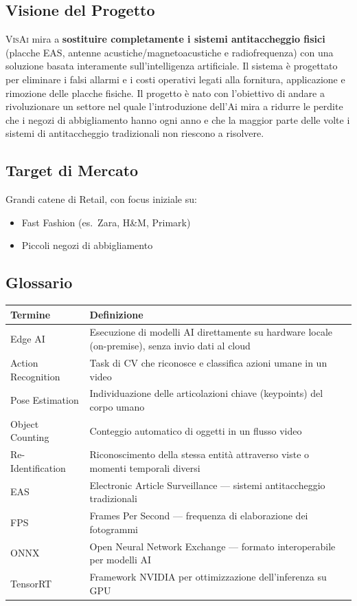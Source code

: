 \documentclass[a4paper, 12pt]{article}
\newcommand{\visai}{\textsc{VisAi}}
\begin{document}
\subsection{Visione del Progetto}

\visai{} mira a \textbf{sostituire completamente i sistemi antitaccheggio fisici} (placche EAS, antenne acustiche/magnetoacustiche e radiofrequenza) con una soluzione basata interamente sull'intelligenza artificiale. Il sistema è progettato per eliminare i falsi allarmi e i costi operativi legati alla fornitura, applicazione e rimozione delle placche fisiche. Il progetto è nato con l'obiettivo di andare a rivoluzionare un settore nel quale l'introduzione dell'Ai mira a ridurre le perdite che i negozi di abbigliamento hanno ogni anno e che la maggior parte delle volte i sistemi di antitaccheggio tradizionali non riescono a risolvere.

\subsection{Target di Mercato}

Grandi catene di Retail, con focus iniziale su:
\begin{itemize}
    \item Fast Fashion (es.\ Zara, H\&M, Primark)
    \item Piccoli negozi di abbigliamento
\end{itemize}

\subsection{Glossario}

\begin{tabularx}{\textwidth}{lL}
    \toprule
    \textbf{Termine} & \textbf{Definizione} \\
    \midrule
    Edge AI & Esecuzione di modelli AI direttamente su hardware locale (on-premise), senza invio dati al cloud \\
    Action Recognition & Task di CV che riconosce e classifica azioni umane in un video \\
    Pose Estimation & Individuazione delle articolazioni chiave (keypoints) del corpo umano \\
    Object Counting & Conteggio automatico di oggetti in un flusso video \\
    Re-Identification & Riconoscimento della stessa entità attraverso viste o momenti temporali diversi \\
    EAS & Electronic Article Surveillance — sistemi antitaccheggio tradizionali \\
    FPS & Frames Per Second — frequenza di elaborazione dei fotogrammi \\
    ONNX & Open Neural Network Exchange — formato interoperabile per modelli AI \\
    TensorRT & Framework NVIDIA per ottimizzazione dell'inferenza su GPU \\
    \bottomrule
\end{tabularx}
\end{document}
